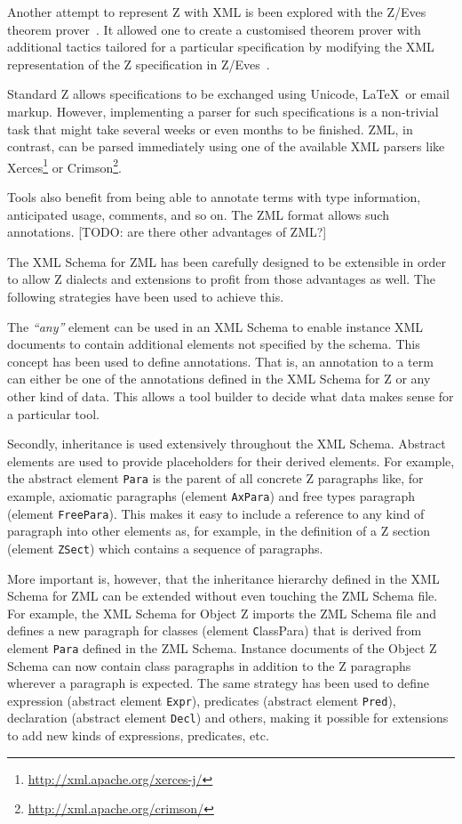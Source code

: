 \documentclass{llncs}
\newcommand{\Element}[1]{\texttt{#1}}
\begin{document}
  Another attempt to represent Z with XML is been explored with the
  Z/Eves theorem prover~\cite{tp.tools:zeves.ref}. It allowed one to
  create a customised theorem prover with additional tactics tailored
  for a particular specification by modifying the XML representation
  of the Z specification in Z/Eves~\cite{tp.tools:zeves.api}.

  Standard Z allows specifications to be exchanged using Unicode,
  \LaTeX\ or email markup.  However, implementing a parser for such
  specifications is a non-trivial task that might take several weeks
  or even months to be finished.  ZML, in contrast, can be parsed
  immediately using one of the available XML parsers like
  Xerces\footnote{\url{http://xml.apache.org/xerces-j/}} or
  Crimson\footnote{\url{http://xml.apache.org/crimson/}}.

  Tools also benefit from being able to annotate terms with type
  information, anticipated usage, comments, and so on.  The ZML format
  allows such annotations. [TODO: are there other advantages of ZML?]

  The XML Schema for ZML has been carefully designed to be extensible
  in order to allow Z dialects and extensions to profit from those
  advantages as well.  The following strategies have been used to
  achieve this.

  The \textit{``any''} element can be used in an XML Schema to enable
  instance XML documents to contain additional elements not specified
  by the schema.  This concept has been used to define annotations.
  That is, an annotation to a term can either be one of the
  annotations defined in the XML Schema for Z or any other kind of
  data.  This allows a tool builder to decide what data makes sense
  for a particular tool.

  Secondly, inheritance is used extensively throughout the XML Schema.
  Abstract elements are used to provide placeholders for their derived
  elements.  For example, the abstract element \Element{Para} is the
  parent of all concrete Z paragraphs like, for example, axiomatic
  paragraphs (element \Element{AxPara}) and free types paragraph
  (element \Element{FreePara}).  This makes it easy to include a
  reference to any kind of paragraph into other elements as, for
  example, in the definition of a Z section (element \Element{ZSect})
  which contains a sequence of paragraphs.

  More important is, however, that the inheritance hierarchy defined
  in the XML Schema for ZML can be extended without even touching the
  ZML Schema file.  For example, the XML Schema for Object Z imports
  the ZML Schema file and defines a new paragraph for classes (element
  \Element ClassPara) that is derived from element \Element{Para}
  defined in the ZML Schema.  Instance documents of the Object Z
  Schema can now contain class paragraphs in addition to the Z
  paragraphs wherever a paragraph is expected.  The same strategy has
  been used to define expression (abstract element \Element{Expr}),
  predicates (abstract element \Element{Pred}), declaration (abstract
  element \Element{Decl}) and others, making it possible for
  extensions to add new kinds of expressions, predicates, etc.
\end{document}
